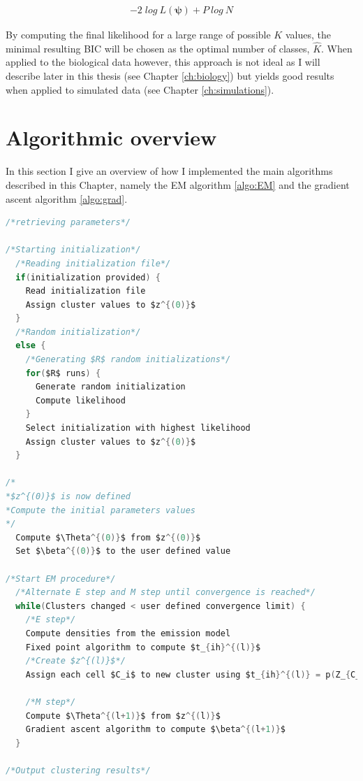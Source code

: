 \begin{align*}
\label{eq:BIC}
- 2\; log\:L(\boldsymbol{\psi}) + P\:log\:N
\end{align*}

By computing the final likelihood for a large range of possible $K$ values, the minimal resulting BIC will be chosen as the optimal number of classes, $\hat{K}$. When applied to the biological data however, this approach is not ideal as I will describe later in this thesis (see Chapter \ref{ch:biology}) but yields good results when applied to simulated data (see Chapter \ref{ch:simulations}).\\

\section{Algorithmic overview}
In this section I give an overview of how I implemented the main algorithms described in this Chapter, namely the EM algorithm \ref{algo:EM} and the gradient ascent algorithm \ref{algo:grad}.

\begin{lstlisting}[mathescape,caption=EM algorithm in C pseudo-code,label=algo:EM,language=C]
/*retrieving parameters*/

/*Starting initialization*/
  /*Reading initialization file*/
  if(initialization provided) {
    Read initialization file
    Assign cluster values to $z^{(0)}$
  }
  /*Random initialization*/
  else {
  	/*Generating $R$ random initializations*/
    for($R$ runs) {
      Generate random initialization
      Compute likelihood
    }
    Select initialization with highest likelihood
    Assign cluster values to $z^{(0)}$
  }
  
/*
*$z^{(0)}$ is now defined
*Compute the initial parameters values
*/
  Compute $\Theta^{(0)}$ from $z^{(0)}$
  Set $\beta^{(0)}$ to the user defined value
  
/*Start EM procedure*/
  /*Alternate E step and M step until convergence is reached*/
  while(Clusters changed < user defined convergence limit) {
    /*E step*/
    Compute densities from the emission model
    Fixed point algorithm to compute $t_{ih}^{(l)}$
    /*Create $z^{(l)}$*/
    Assign each cell $C_i$ to new cluster using $t_{ih}^{(l)} = p(Z_{C_i} = h)$
    
    /*M step*/
    Compute $\Theta^{(l+1)}$ from $z^{(l)}$
    Gradient ascent algorithm to compute $\beta^{(l+1)}$
  }

/*Output clustering results*/
\end{lstlisting}

